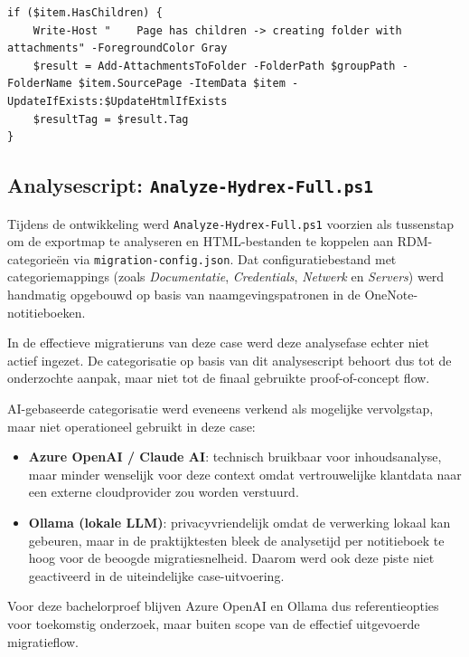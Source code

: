\begin{listing}[htbp]
\begin{lstlisting}
if ($item.HasChildren) {
    Write-Host "    Page has children -> creating folder with attachments" -ForegroundColor Gray
    $result = Add-AttachmentsToFolder -FolderPath $groupPath -FolderName $item.SourcePage -ItemData $item -UpdateIfExists:$UpdateHtmlIfExists
    $resultTag = $result.Tag
}
\end{lstlisting}
\caption{Keuze tussen folder-entry en document-entry op basis van onderliggende pagina's}
\label{lst:boomstructuur-import}
\end{listing}

\subsection{Analysescript: \texttt{Analyze-Hydrex-Full.ps1}}
\label{subsec:analysescript}

Tijdens de ontwikkeling werd \texttt{Analyze-Hydrex-Full.ps1} voorzien als tussenstap om de exportmap te analyseren en HTML-bestanden te koppelen aan RDM-categorieën via \texttt{migration-config.json}. Dat configuratiebestand met categoriemappings (zoals \emph{Documentatie}, \emph{Credentials}, \emph{Netwerk} en \emph{Servers}) werd handmatig opgebouwd op basis van naamgevingspatronen in de OneNote-notitieboeken.

In de effectieve migratieruns van deze case werd deze analysefase echter niet actief ingezet. De categorisatie op basis van dit analysescript behoort dus tot de onderzochte aanpak, maar niet tot de finaal gebruikte proof-of-concept flow.

AI-gebaseerde categorisatie werd eveneens verkend als mogelijke vervolgstap, maar niet operationeel gebruikt in deze case:
\begin{itemize}
    \item \textbf{Azure OpenAI / Claude AI}: technisch bruikbaar voor inhoudsanalyse, maar minder wenselijk voor deze context omdat vertrouwelijke klantdata naar een externe cloudprovider zou worden verstuurd.
    \item \textbf{Ollama (lokale LLM)}: privacyvriendelijk omdat de verwerking lokaal kan gebeuren, maar in de praktijktesten bleek de analysetijd per notitieboek te hoog voor de beoogde migratiesnelheid. Daarom werd ook deze piste niet geactiveerd in de uiteindelijke case-uitvoering.
\end{itemize}

Voor deze bachelorproef blijven Azure OpenAI en Ollama dus referentieopties voor toekomstig onderzoek, maar buiten scope van de effectief uitgevoerde migratieflow.

